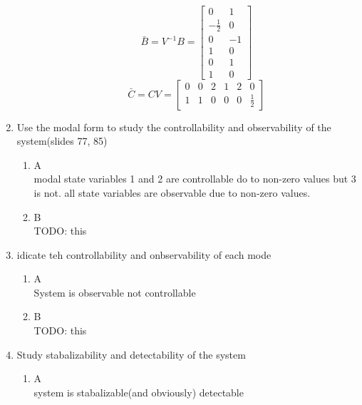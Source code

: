 \begin{enumerate}
\begin{enumerate}
\begin{equation}
      \end{equation}
      \begin{equation}
        \bar B = V^{-1}B = 
        \left[\begin{matrix}0 & 1\\- \frac{1}{2} & 0\\0 & -1\\1 & 0\\0 & 1\\1 & 0\end{matrix}\right]
      \end{equation}
      \begin{equation}
        \bar C = CV =
        \left[\begin{matrix}0 & 0 & 2 & 1 & 2 & 0\\1 & 1 & 0 & 0 & 0 & \frac{1}{2}\end{matrix}\right]
      \end{equation}
    \end{enumerate}
  \item Use the modal form to study the controllability and observability of the system(slides 77, 85)\\
    \begin{enumerate}
    \item A\\
      modal state variables 1 and 2 are controllable do to non-zero values but 3 is not. all state variables are
      observable due to non-zero values.
    \item B\\
      {\LARGE \color{red} TODO: this}
    \end{enumerate}
  \item idicate teh controllability and onbservability of each mode\\
    \begin{enumerate}
    \item A\\
      System is observable not controllable
    \item B\\
      {\LARGE \color{red} TODO: this}
    \end{enumerate}
  \item Study stabalizability and detectability of the system\\
    \begin{enumerate}
    \item A\\
      system is stabalizable(and obviously) detectable

\end{enumerate}
\end{enumerate}
